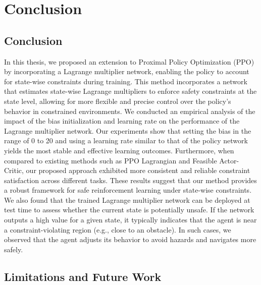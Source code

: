 
\chapter{Conclusion}\label{chapter5}

\section{Conclusion}

In this thesis, we proposed an extension to Proximal Policy Optimization (PPO) by incorporating a Lagrange multiplier network, enabling the policy to account for state-wise constraints during training.
This method incorporates a network that estimates state-wise Lagrange multipliers to enforce safety constraints at the state level, allowing for more flexible and precise control over the policy's behavior in constrained environments.
We conducted an empirical analysis of the impact of the bias initialization and learning rate on the performance of the Lagrange multiplier network.
Our experiments show that setting the bias in the range of 0 to 20 and using a learning rate similar to that of the policy network yields the most stable and effective learning outcomes.
Furthermore, when compared to existing methods such as PPO Lagrangian and Feasible Actor-Critic, our proposed approach exhibited more consistent and reliable constraint satisfaction across different tasks.
These results suggest that our method provides a robust framework for safe reinforcement learning under state-wise constraints.
We also found that the trained Lagrange multiplier network can be deployed at test time to assess whether the current state is potentially unsafe.
If the network outputs a high value for a given state, it typically indicates that the agent is near a constraint-violating region (e.g., close to an obstacle).
In such cases, we observed that the agent adjusts its behavior to avoid hazards and navigates more safely.

\section{Limitations and Future Work}

